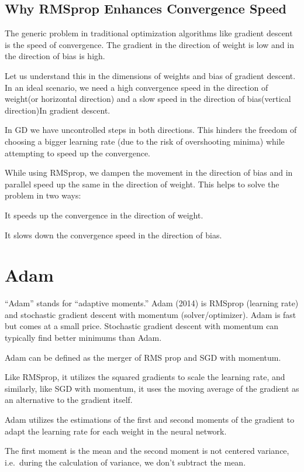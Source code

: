 	\subsection{Why RMSprop Enhances Convergence Speed}
	\begin{bulletedlist}
		\item The generic problem in traditional optimization algorithms like gradient descent is the speed of convergence. The gradient in the direction of weight is low and in the direction of bias is high.
		\item Let us understand this in the dimensions of weights and bias of gradient descent.  In an ideal scenario, we need a high convergence speed in the direction of weight(or horizontal direction) and a slow speed in the direction of bias(vertical direction)In gradient descent.
		\item In GD we have uncontrolled steps in both directions.  This hinders the freedom of choosing a bigger learning rate (due to the risk of overshooting minima) while attempting to speed up the convergence.
		\item While using RMSprop, we dampen the movement in the direction of bias and in parallel speed up the same in the direction of weight.  This helps to solve the problem in two ways:
		\begin{bulletedlist}
			\item It speeds up the convergence in the direction of weight.
			\item It slows down the convergence speed in the direction of bias.
		\end{bulletedlist}
	\end{bulletedlist}

	\section{Adam}
``Adam'' stands for ``adaptive moments.''  Adam (2014) is RMSprop (learning rate) and stochastic gradient descent with momentum (solver/optimizer).  Adam is fast but comes at a small price. Stochastic gradient descent with momentum can typically find better minimums than Adam.

	\begin{bulletedlist}
		\item Adam can be defined as the merger of RMS prop and SGD with momentum.
		\item Like RMSprop, it utilizes the squared gradients to scale the learning rate, and similarly, like SGD with momentum, it uses the moving average of the gradient as an alternative to the gradient itself.
		\item Adam utilizes the estimations of the first and second moments of the gradient to adapt the learning rate for each weight in the neural network.
		\item The first moment is the mean and the second moment is not centered variance, i.e.\ during the calculation of variance, we don't subtract the mean.
	\end{bulletedlist}

